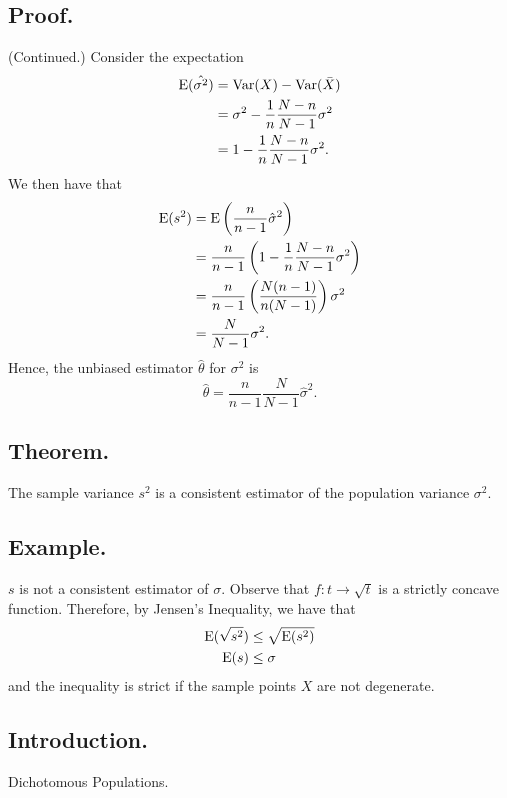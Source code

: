\documentclass[titlepage]{article}
\begin{document}
\subsection{Proof.} (Continued.) Consider the expectation 
\begin{align*}
    \text{E}(\hat{\sigma^{2}}) &= \text{Var}(X) - \text{Var}(\bar{X}) \\
                         &= \sigma^{2} - \frac{1}{n}\frac{N-n}{N-1}\sigma^{2} \\
                         &= 1 - \frac{1}{n}\frac{N-n}{N-1}\sigma^{2}.
\end{align*}
We then have that 
\begin{align*}
    \text{E}(s^{2}) &= \text{E}\left(\frac{n}{n-1}\hat{\sigma}^{2}\right) \\
              &= \frac{n}{n-1}\left(1 - \frac{1}{n}\frac{N-n}{N-1}\sigma^{2}\right) \\
              &= \frac{n}{n-1}\left(\frac{N(n-1)}{n(N-1)}\right)\sigma^{2} \\
              &= \frac{N}{N-1}\sigma^{2}.
\end{align*}
Hence, the unbiased estimator $\hat{\theta}$ for $\sigma^{2}$ is
$$\hat{\theta} = \frac{n}{n-1}\frac{N}{N-1}\hat{\sigma}^{2}.$$

\subsection{Theorem.} The sample variance $s^{2}$ is a consistent estimator of the population variance $\sigma^{2}$.

\subsection{Example.} $s$ is not a consistent estimator of $\sigma$. Observe that $f: t \to \sqrt{t}$ is a strictly concave function. Therefore, by Jensen's Inequality, we have that
\begin{align*}
    \text{E}(\sqrt{s^{2}}) &\leq \sqrt{\text{E}(s^{2})} \\
               \text{E}(s) &\leq \sigma
\end{align*}
and the inequality is strict if the sample points $X$ are not degenerate.

\newpage {}

\subsection{Introduction.} Dichotomous Populations.
\end{document}
